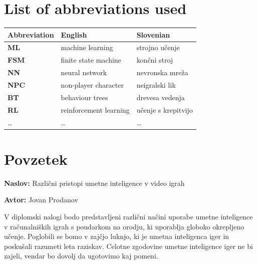 \documentclass[a4paper, 12pt]{book}
\newcommand{\ttitle}{Različni pristopi umetne inteligence v video igrah}
\newcommand{\tauthor}{Jovan Prodanov}
\newcommand{\clearemptydoublepage}{\newpage{\pagestyle{empty}\cleardoublepage}}
\begin{document}
\chapter*{List of abbreviations used}  %

\noindent\begin{tabular}{p{}|p{}|p{}}    %
  {\bf Abbreviation} & {\bf English} & {\bf Slovenian} \\ \hline
  {\bf ML}      & machine learning                  & strojno učenje \\
  {\bf FSM}     & finite state machine              & končni stroj \\
  {\bf NN}      & neural network                    & nevronska mreža \\
  {\bf NPC}     & non-player character              & neigralski lik \\
  {\bf BT }     & behaviour trees                   & drevesa vedenja \\
  {\bf RL }     & reinforcement learning            & učenje s krepitvijo \\
  \dots         & \dots                             & \dots \\
\end{tabular}

\clearemptydoublepage


\chapter*{Povzetek}

\noindent\textbf{Naslov:} \ttitle
\bigskip

\noindent\textbf{Avtor:} \tauthor
\bigskip

\noindent 
V diplomski nalogi bodo predstavljeni različni načini uporabe umetne inteligence v računalniških igrah s poudarkom na orodju, ki uporablja globoko okrepljeno učenje. Poglobili se bomo v zajčjo luknjo, ki je umetna inteligenca iger in poskušali razumeti leta raziskav. Celotne zgodovine umetne inteligence iger ne bi zajeli, vendar bo dovolj da ugotovimo kaj pomeni.
\bigskip
\end{document}
